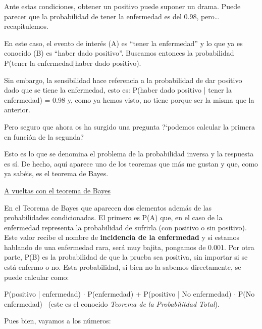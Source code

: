 \begin{myexampleblock}
\begin{small}
\vspace{2mm} Ante estas condiciones, obtener un positivo puede suponer un drama. Puede parecer que la probabilidad de tener la enfermedad es del 0.98, pero… recapitulemos. 

\vspace{2mm} En este caso, el evento de interés (A) es “tener la enfermedad” y lo que ya es conocido (B) es “haber dado positivo”. Buscamos entonces la probabilidad P(tener la enfermedad|haber dado positivo).


\vspace{2mm} Sin embargo, la sensibilidad hace referencia a la probabilidad de dar positivo dado que se tiene la enfermedad, esto es: P(haber dado positivo | tener la enfermedad) = 0.98 y, como ya hemos visto, no tiene porque ser la misma que la anterior.

\vspace{2mm} Pero seguro que ahora os ha surgido una pregunta ?`podemos calcular la primera en función de la segunda?

\vspace{2mm} Esto es lo que se denomina el problema de la probabilidad inversa y la respuesta es sí. De hecho, aquí aparece uno de los teoremas que más me gustan y que, como ya sabéis, es el teorema de Bayes.



\vspace{2mm} \underline{A vueltas con el teorema de Bayes}



\vspace{2mm} En el Teorema de Bayes que aparecen dos elementos además de las probabilidades condicionadas. El primero es P(A) que, en el caso de la enfermedad representa la probabilidad de sufrirla (con positivo o sin positivo). Este valor recibe el nombre de \textbf{incidencia de la enfermedad} y si estamos hablando de una enfermedad rara, será muy bajita, pongamos de 0.001. Por otra parte, P(B) es la probabilidad de que la prueba sea positiva, sin importar si se está enfermo o no. Esta probabilidad, si bien no la sabemos directamente, se puede calcular como:

\vspace{2mm} P(positivo | enfermedad) $\cdot$ P(enfermedad) + P(positivo | No enfermedad) $\cdot$ P(No enfermedad)  \textcolor{gris}{ (este es el conocido \emph{Teorema de la Probabilitdad Total})}.

\vspace{2mm} Pues bien, vayamos a los números:


\end{small}
\end{myexampleblock}
